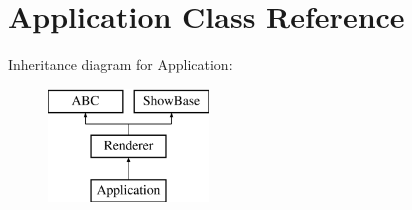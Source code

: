 \hypertarget{classapplication_1_1_application}{}\section{Application Class Reference}
\label{classapplication_1_1_application}
Inheritance diagram for Application\+:\begin{figure}[H]
\begin{center}
\leavevmode
\includegraphics[height=3.000000cm]{classapplication_1_1_application}
\end{center}
\end{figure}
